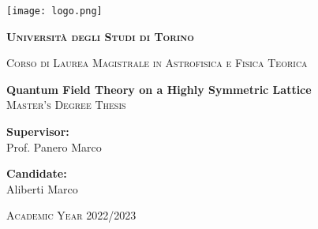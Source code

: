 \thispagestyle{empty}
\begin{center}
    \texttt{[image: logo.png]}
    \vspace{0.5cm}\\
    {\LARGE\bfseries\scshape Università degli Studi di Torino \par}
	\vspace{0,3cm}
	{\large\scshape Corso di Laurea Magistrale in Astrofisica e Fisica Teorica\par}
    \vspace{2cm}
	{\LARGE\bfseries Quantum Field Theory on a Highly Symmetric Lattice}
	\vspace{0.3cm}\\
    {\scshape\Large Master's Degree Thesis}
	\vspace{0,5cm}
\end{center}
\vspace{2cm}
\begin{minipage}[t]{0.4\textwidth} %
    {\large{{\bf Supervisor:}\\
        Prof. Panero Marco}}
\end{minipage}
\hfill
\begin{minipage}[t]{0.47\textwidth}\raggedleft %
    {\large{{\bf Candidate:}\\
        Aliberti Marco}}
    \vspace{12mm}
\end{minipage}
\hfill
\vspace{18mm}
\begin{center} %
    \large{\scshape Academic Year 2022/2023}
\end{center} 
